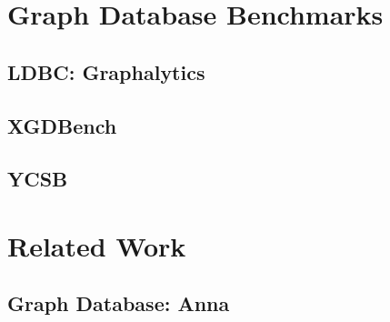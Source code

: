 \section{Graph Database Benchmarks}

\subsection{LDBC: Graphalytics}

\subsection{XGDBench}

\subsection{YCSB}

\section{Related Work}

\subsection{Graph Database: Anna}

\subsection{}
